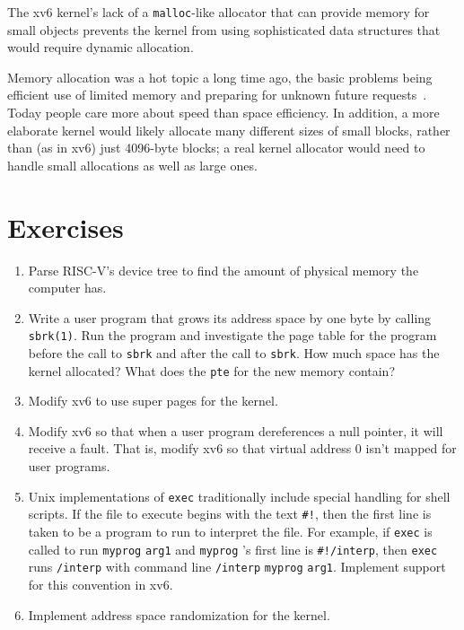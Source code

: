 The xv6 kernel's lack of a {\tt malloc}-like allocator that can
provide memory for small objects prevents the kernel from using
sophisticated data structures that would require dynamic allocation.

Memory allocation was a hot topic a long time ago, the basic problems being
efficient use of limited memory and
preparing for unknown future requests~\cite{knuth}.  Today people care more about speed than
space efficiency.  In addition, a more elaborate kernel
would likely allocate many different sizes of small blocks,
rather than (as in xv6) just 4096-byte blocks;
a real kernel
allocator would need to handle small allocations as well as large
ones.
\section{Exercises}

\begin{enumerate}
  
\item Parse RISC-V's device tree to find the amount of physical memory
the computer has.

\item Write a user program that grows its address space by one byte by calling
\lstinline{sbrk(1)}.
Run the  program and investigate the page table for the program before the call
to
\lstinline{sbrk}
and after the call to
\lstinline{sbrk}.
How much space has the kernel allocated?  What does the
\lstinline{pte}
for the new memory contain?

\item Modify xv6 to use super pages for the kernel.

\item Modify xv6 so that when a user program dereferences a null pointer, it will
receive a fault.  That is, modify xv6 so that virtual address 0 isn't mapped for
user programs.

\item Unix implementations of
\lstinline{exec}
traditionally include special handling for shell scripts.
If the file to execute begins with the text
\lstinline{#!},
then the first line is taken to be a program
to run to interpret the file.
For example, if
\lstinline{exec}
is called to run
\lstinline{myprog}
\lstinline{arg1}
and
\lstinline{myprog} 's
first line is
\lstinline{#!/interp},
then
\lstinline{exec}
runs
\lstinline{/interp}
with command line
\lstinline{/interp}
\lstinline{myprog}
\lstinline{arg1}.
Implement support for this convention in xv6.

\item Implement address space randomization for the kernel.

\end{enumerate}

